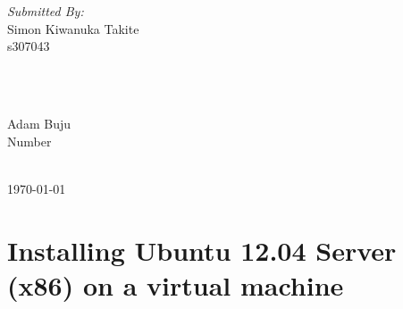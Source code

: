 \documentclass[12pt]{article}
\begin{document}
\begin{titlepage}
\begin{minipage}{0.4\textwidth}
\begin{flushleft} \large
\emph{Submitted By:}\\
Simon Kiwanuka Takite \\s307043 %
\end{flushleft}
\end{minipage}
~
\begin{minipage}{0.4\textwidth}
\begin{flushright} \large
\emph{}\\
Adam Buju \\Number %
\end{flushright}
\end{minipage}\\[1cm]


{\large \today }\\[1cm] %

\vfill %

\end{titlepage}



\section{Installing Ubuntu 12.04 Server (x86) on a virtual machine}
\end{document}
